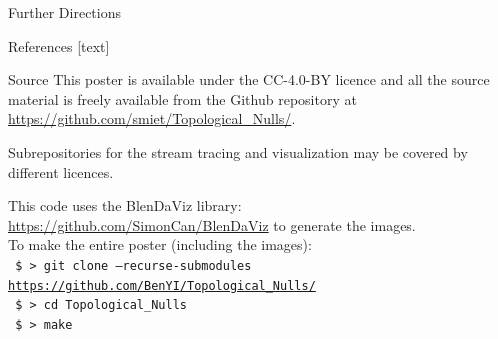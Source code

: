 \documentclass[final]{beamer}
\newlength{\sepwid}
\newlength{\onecolwid}
\begin{document}
\begin{frame}[t]
\begin{columns}[t]
\begin{column}{\onecolwid}
\begin{block}{\huge Further Directions}
\end{block}

\begin{block}{\huge References}
\nocite{*} %
[text]

\vspace{0.75in}
\end{block}

\begin{block}{\huge Source}
This poster is available under the  CC-4.0-BY  licence and all the source material is freely
available from the Github repository at \url{https://github.com/smiet/Topological_Nulls/}.

Subrepositories for the stream tracing and visualization may be covered by different licences. 

This code uses the BlenDaViz library: \url{https://github.com/SimonCan/BlenDaViz} to generate the images. \\

    To make the entire poster (including the images):\\
\texttt{
	\$ > git clone --recurse-submodules  \url{https://github.com/BenYI/Topological_Nulls/}}\\
\texttt{
    \$ > cd Topological\_Nulls\\
  }
\texttt{
    \$ > make
  }
\vspace{2.2cm}
\begin{figure}
    \centering
\end{figure}
\end{block}
\end{column}

\begin{column}{\sepwid}\end{column} %


\end{columns} %

\end{frame} %
\end{document}
